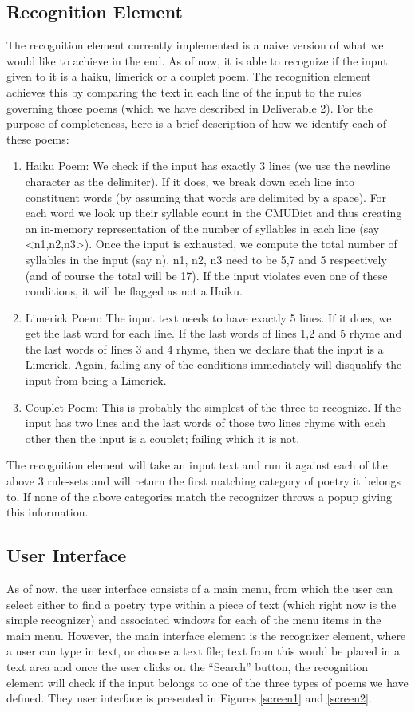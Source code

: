 \documentclass[10pt, letter]{article}
\begin{document}
\subsection*{Recognition Element}
The recognition element currently implemented is a naive version of what we would like to achieve in the end. As of now, it is able to recognize if the input given to it is a haiku, limerick or a couplet poem. The recognition element achieves this by comparing the text in each line of the input to the rules governing those poems (which we have described in Deliverable 2). For the purpose of completeness, here is a brief description of how we identify each of these poems:
\begin{enumerate}
\item Haiku Poem: We check if the input has exactly 3 lines (we use the newline character as the delimiter). If it does, we break down each line into constituent words (by assuming that words are delimited by a space). For each word we look up their syllable count in the CMUDict and thus creating an in-memory representation of the number of syllables in each line (say <n1,n2,n3>). Once the input is exhausted, we compute the total number of syllables in the input (say n). n1, n2, n3 need to be 5,7 and 5 respectively (and of course the total will be 17). If the input violates even one of these conditions, it will be flagged as not a Haiku.

\item Limerick Poem: The input text needs to have exactly 5 lines. If it does, we get the last word for each line. If the last words of lines 1,2 and 5 rhyme and the last words of lines 3 and 4 rhyme, then we declare that the input is a Limerick. Again, failing any of the conditions immediately will disqualify the input from being a Limerick.

\item Couplet Poem: This is probably the simplest of the three to recognize. If the input has two lines and the last words of those two lines rhyme with each other then the input is a couplet; failing which it is not.
\end{enumerate}

The recognition element will take an input text and run it against each of the above 3 rule-sets and will return the first matching category of poetry it belongs to. If none of the above categories match the recognizer throws a popup giving this information.
\subsection*{User Interface}
As of now, the user interface consists of a main menu, from which the user can select either to find a poetry type within a piece of text (which right now is the simple recognizer) and associated windows for each of the menu items in the main menu.
    However, the main interface element is the recognizer element, where a user can type in text, or choose a text file; text from this would be placed in a text area and once the user clicks on the “Search” button, the recognition element will check if the input belongs to one of the three types of poems we have defined. They user interface is presented in Figures \ref{screen1} and \ref{screen2}.
    
\end{document}
